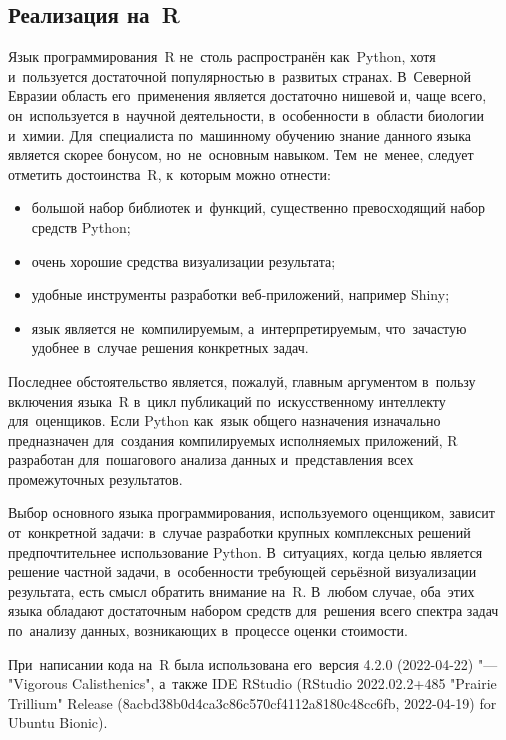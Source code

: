 \documentclass[]{scrartcl}
\begin{document}
\subsection{Реализация на~R}\label{U-test-R}
%
%
Язык программирования~R не~столь распространён как~Python, хотя и~пользуется достаточной популярностью в~развитых странах. В~Северной Евразии область его~применения является достаточно нишевой и, чаще всего, он~используется в~научной деятельности, в~особенности в~области биологии и~химии. Для~специалиста по~машинному обучению знание данного языка является скорее бонусом, но~не~основным навыком. Тем~не~менее, следует отметить достоинства~R, к~которым можно отнести:
\begin{itemize}
	\item большой набор библиотек и~функций, существенно превосходящий набор средств Python;
	\item очень хорошие средства визуализации результата;
	\item удобные инструменты разработки веб-приложений, например Shiny;
	\item язык является не~компилируемым, а~интерпретируемым, что~зачастую удобнее в~случае решения конкретных задач.
\end{itemize}
Последнее обстоятельство является, пожалуй, главным аргументом в~пользу включения языка~R в~цикл публикаций по~искусственному интеллекту для~оценщиков. Если Python как~язык общего назначения изначально предназначен для~создания компилируемых исполняемых приложений, R разработан для~пошагового анализа данных и~представления всех промежуточных результатов. 

Выбор основного языка программирования, используемого оценщиком, зависит от~конкретной задачи: в~случае разработки крупных комплексных решений предпочтительнее использование Python. В~ситуациях, когда целью является решение частной задачи, в~особенности требующей серьёзной визуализации результата, есть смысл обратить внимание на~R. В~любом случае, оба~этих языка обладают достаточным набором средств для~решения всего спектра задач по~анализу данных, возникающих в~процессе оценки стоимости.

При~написании кода на~R была использована его~версия 4.2.0 (2022-04-22) \foreignlanguage{english}{"--- "Vigorous Calisthenics"}, а~также \foreignlanguage{english}{IDE RStudio (RStudio 2022.02.2+485 "Prairie Trillium" Release (8acbd38b0d4ca3c86c570cf4112a8180c48cc6fb, 2022-04-19) for Ubuntu Bionic)}. 
\end{document}
